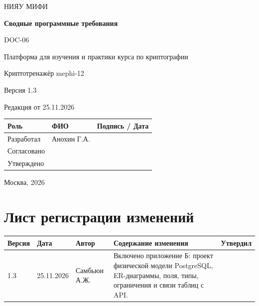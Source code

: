 \documentclass[12pt,a4paper]{article}
\begin{document}
\hypersetup{pageanchor=false}
\begin{titlepage}
  \thispagestyle{empty}
  \centering
  {\large НИЯУ МИФИ\par}
  \vspace*{3.5cm}
  {\LARGE\bfseries Сводные программные требования\par}
  \vspace{0.5cm}
  {\large DOC-06\par}
  \vspace{0.6cm}
  {\large Платформа для изучения и практики курса по криптографии\par}
  {\large Криптотренажёр mephi-12\par}
  \vspace{0.7cm}
  {\large Версия 1.3\par}
  {\large Редакция от 25.11.2026\par}
  \vspace{1cm}
  \begin{tabularx}{\textwidth}{@{}p{3.4cm}Xp{4cm}@{}}
    \toprule
    Роль & ФИО & Подпись / Дата \\
    \midrule
    Разработал & Анохин Г.А. & \\
    \addlinespace[6pt]
    Согласовано & & \\
    \addlinespace[6pt]
    Утверждено & & \\
    \bottomrule
  \end{tabularx}
  \vfill
  {\large Москва, 2026\par}
\end{titlepage}
\hypersetup{pageanchor=true}

\section*{Лист регистрации изменений}
\begingroup\small\singlespacing
\noindent
\begin{tabularx}{\textwidth}{@{}p{1.2cm}p{2cm}p{2.5cm}Xp{1.8cm}@{}}
\toprule
Версия & Дата & Автор & Содержание изменения & Утвердил \\
\midrule
1.3 & 25.11.2026 & Самбьюи А.Ж. & Включено приложение Б: проект физической модели PostgreSQL, ER-диаграммы, поля, типы, ограничения и связи таблиц с API. & \\
\bottomrule
\end{tabularx}
\endgroup
\clearpage
\begingroup\small\singlespacing
\tableofcontents
\endgroup
\clearpage
\end{document}
